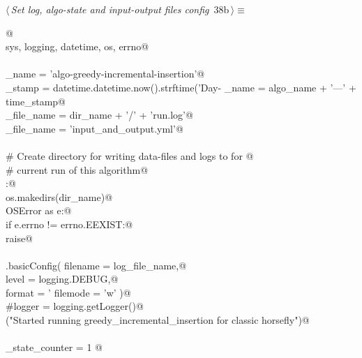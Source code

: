\documentclass[11.5pt]{report}
\begin{document}
\begin{flushleft} \small\label{scrap47}\raggedright\small
{} $\langle\,${\itshape Set log, algo-state and input-output files config}\nobreak\ {\footnotesize {38b}}$\,\rangle\equiv$
\vspace{-1ex}
\begin{list}{}{} \item
\mbox{}\verb@  @\\
\mbox{}\verb@import sys, logging, datetime, os, errno@\\
\mbox{}\verb@@\\
\mbox{}\verb@algo_name     = 'algo-greedy-incremental-insertion'@\\
\mbox{}\verb@time_stamp    = datetime.datetime.now().strftime('Day-%Y-%m-%d_ClockTime-%H:%M:%S')@\\
\mbox{}\verb@dir_name      = algo_name + '---' + time_stamp@\\
\mbox{}\verb@log_file_name = dir_name + '/' + 'run.log'@\\
\mbox{}\verb@io_file_name  = 'input_and_output.yml'@\\
\mbox{}\verb@@\\
\mbox{}\verb@# Create directory for writing data-files and logs to for @\\
\mbox{}\verb@# current run of this algorithm@\\
\mbox{}\verb@try:@\\
\mbox{}\verb@    os.makedirs(dir_name)@\\
\mbox{}\verb@except OSError as e:@\\
\mbox{}\verb@    if e.errno != errno.EEXIST:@\\
\mbox{}\verb@        raise@\\
\mbox{}\verb@@\\
\mbox{}\verb@logging.basicConfig( filename = log_file_name,@\\
\mbox{}\verb@                     level    = logging.DEBUG,@\\
\mbox{}\verb@                     format   = '%(asctime)s: %(levelname)s: %(message)s',@\\
\mbox{}\verb@                     filemode = 'w' )@\\
\mbox{}\verb@#logger = logging.getLogger()@\\
\mbox{}\verb@info("Started running greedy_incremental_insertion for classic horsefly")@\\
\mbox{}\verb@@\\
\mbox{}\verb@algo_state_counter = 1 @\\

\end{list}
\end{flushleft}
\end{document}
